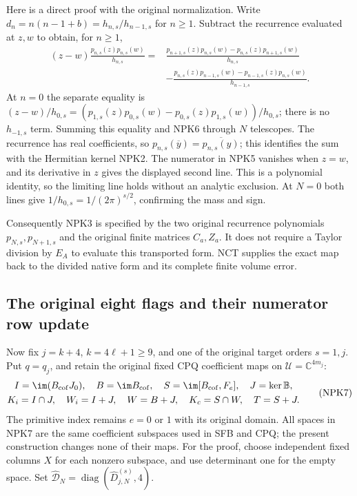 \documentclass[11pt,a4paper]{article}
\begin{document}
Here is a direct proof with the original normalization. Write
$d_n=n(n-1+b)=h_{n,s}/h_{n-1,s}$ for $n\ge1$.
Subtract the recurrence evaluated at $z,w$ to obtain, for $n\ge1$,
\[
 \begin{split}
 (z-w)\frac{p_{n,s}(z)p_{n,s}(w)}{h_{n,s}}
 ={}&\frac{p_{n+1,s}(z)p_{n,s}(w)-p_{n,s}(z)p_{n+1,s}(w)}{h_{n,s}}\\
 &-\frac{p_{n,s}(z)p_{n-1,s}(w)-p_{n-1,s}(z)p_{n,s}(w)}{h_{n-1,s}}.
 \end{split}\tag{NPK6}
\]
At $n=0$ the separate equality is
$(z-w)/h_{0,s}=(p_{1,s}(z)p_{0,s}(w)-p_{0,s}(z)p_{1,s}(w))/h_{0,s}$;
there is no $h_{-1,s}$ term. Summing this equality and NPK6
through $N$ telescopes. The recurrence has real
coefficients, so $p_{n,s}(\overline y)=\overline{p_{n,s}(y)}$;
this identifies the sum with the Hermitian kernel NPK2. The
numerator in NPK5 vanishes when $z=w$, and its derivative in $z$
gives the displayed second line. This is a polynomial identity,
so the limiting line holds without an analytic exclusion.
At $N=0$ both lines give $1/h_{0,s}=1/(2\pi)^{s/2}$,
confirming the mass and sign.

Consequently NPK3 is specified by the two original recurrence
polynomials $p_{N,s},p_{N+1,s}$ and the original finite matrices
$C_a,Z_a$. It does not require a Taylor division by $E_A$ to
evaluate this transported form. NCT supplies the exact map back
to the divided native form and its complete finite volume error.

\subsection{The original eight flags and their numerator row update}
Now fix $j=k+4$, $k=4\ell+1\ge9$, and one of the original target
orders $s=1,j$. Put $q=q_j$, and retain the original fixed CPQ
coefficient maps on $\mathcal U=\mathbb C^{4m_j}$:
\[
 \begin{gathered}
 I=\im(B_{\rm cof}J_0),\quad B=\im B_{\rm cof},\quad
 S=\im[B_{\rm cof},F_e],\quad J=\ker\mathbb B,\\
 K_i=I\cap J,\quad W_i=I+J,\quad W=B+J,\quad
 K_c=S\cap W,\quad T=S+J .
 \end{gathered}\tag{NPK7}
\]
The primitive index remains $e=0$ or $1$ with its original domain.
All spaces in NPK7 are the same coefficient subspaces used in SFB
and CPQ; the present construction changes none of their maps.
For the proof, choose independent fixed columns $X$ for each
nonzero subspace, and use determinant one for the empty space.
Set $\widehat{\mathcal D}_N=\operatorname{diag}(\widehat D_{j,N}^{(s)},4)$.
\end{document}
